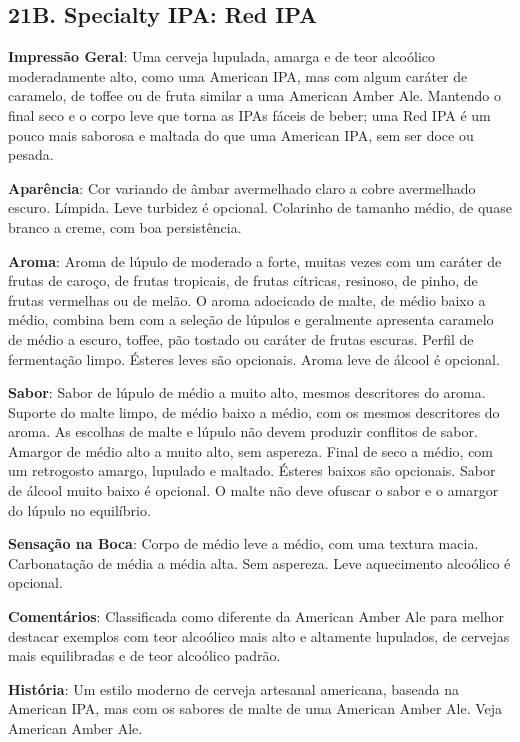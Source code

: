\subsection*{21B. Specialty IPA: Red IPA}

\textbf{Impressão Geral}: Uma cerveja lupulada, amarga e de teor alcoólico moderadamente alto, como uma American IPA, mas com algum caráter de caramelo, de toffee ou de fruta similar a uma American Amber Ale. Mantendo o final seco e o corpo leve que torna as IPAs fáceis de beber; uma Red IPA é um pouco mais saborosa e maltada do que uma American IPA, sem ser doce ou pesada.

\textbf{Aparência}: Cor variando de âmbar avermelhado claro a cobre avermelhado escuro. Límpida. Leve turbidez é opcional. Colarinho de tamanho médio, de quase branco a creme, com boa persistência.

\textbf{Aroma}: Aroma de lúpulo de moderado a forte, muitas vezes com um caráter de frutas de caroço, de frutas tropicais, de frutas cítricas, resinoso, de pinho, de frutas vermelhas ou de melão. O aroma adocicado de malte, de médio baixo a médio, combina bem com a seleção de lúpulos e geralmente apresenta caramelo de médio a escuro, toffee, pão tostado ou caráter de frutas escuras. Perfil de fermentação limpo. Ésteres leves são opcionais. Aroma leve de álcool é opcional.

\textbf{Sabor}: Sabor de lúpulo de médio a muito alto, mesmos descritores do aroma. Suporte do malte limpo, de médio baixo a médio, com os mesmos descritores do aroma. As escolhas de malte e lúpulo não devem produzir conflitos de sabor. Amargor de médio alto a muito alto, sem aspereza. Final de seco a médio, com um retrogosto amargo, lupulado e maltado. Ésteres baixos são opcionais. Sabor de álcool muito baixo é opcional. O malte não deve ofuscar o sabor e o amargor do lúpulo no equilíbrio.

\textbf{Sensação na Boca}: Corpo de médio leve a médio, com uma textura macia. Carbonatação de média a média alta. Sem aspereza. Leve aquecimento alcoólico é opcional.

\textbf{Comentários}: Classificada como diferente da American Amber Ale para melhor destacar exemplos com teor alcoólico mais alto e altamente lupulados, de cervejas mais equilibradas e de teor alcoólico padrão.

\textbf{História}: Um estilo moderno de cerveja artesanal americana, baseada na American IPA, mas com os sabores de malte de uma American Amber Ale. Veja American Amber Ale.

